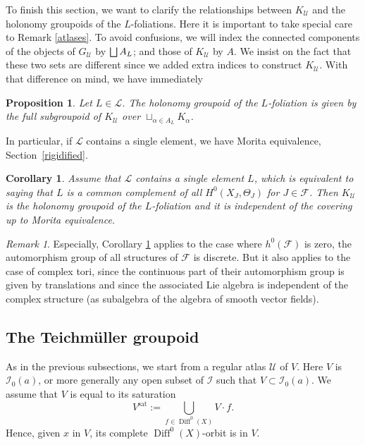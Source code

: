 \documentclass[10pt]{amsart}
\let\mathcal\mathscr
\let\oldbigsqcup\bigsqcup
\renewcommand{\bigsqcup}{\mathop{\textstyle\oldbigsqcup}\displaylimits}
\newcommand{\sat}{\mathrm{sat}}
\DeclareMathOperator{\Diff}{Diff}
\theoremstyle{plain}
\newtheorem{corollary}[theorem]{Corollary}
\newtheorem{proposition}[theorem]{Proposition}
\theoremstyle{definition}
\theoremstyle{remark}
\newtheorem{remark}[theorem]{Remark}
\numberwithin{equation}{section}
\newcommand{\cI}{\mathcal{I}}
\begin{document}
To finish this section, we want to clarify the relationships between $K_{\mathcal U}$ and the holonomy groupoids of the $L$-foliations. Here it is important to take special care to Remark \ref{atlases}. To avoid confusions, we will index the connected components of the objects of $G_{\mathcal U}$ by $\bigsqcup A_L$; and those of $K_{\mathcal U}$ by $A$. We insist on the fact that these two sets are different since we added extra indices to construct $K_{\mathcal U}$. With that difference on mind, we have immediately

\begin{proposition}
\label{autregroupoid}
Let $L\in\mathcal L$. The holonomy groupoid of the $L$-foliation is given by the full subgroupoid of $K_{\mathcal U}$ over $\sqcup_{\alpha\in A_L}K_\alpha$.
\end{proposition}

In particular, if $\mathcal L$ contains a single element, we have Morita equivalence, \cf Section~\ref{rigidified}.

\begin{corollary}
\label{groupoidIIbis}
Assume that $\mathcal L$ contains a single element $L$, which is equivalent to saying that $L$ is a common complement of all $H^0(X_J,\Theta_J)$ for $J\in \mathcal F$. Then $K_{\mathcal U}$ is the holonomy groupoid of the $L$-foliation and it is independent of the covering up to Morita equivalence.
\end{corollary}

\begin{remark}
\label{applicor}
Especially, Corollary \ref{groupoidIIbis} applies to the case where $h^0(\mathcal F)$ is zero, \ie the automorphism group of all structures of $\mathcal F$ is discrete. But it also applies to the case of complex tori, since the continuous part of their automorphism group is given by translations and since the associated Lie algebra is independent of the complex structure (as subalgebra of the algebra of smooth vector fields). \end{remark}

\subsection{The Teichmüller groupoid}
\label{Teichsub}
As in the previous subsections, we start from a regular atlas $\mathcal U$ of $V$. Here $V$ is $\cI_0(a)$, or more generally any open subset of $\cI$ such that $V\subset \cI_0(a)$. We assume that $V$ is equal to its saturation
\begin{equation}
\label{sat}
V^{\sat}:=\bigcup_{f\in\Diff^0(X)}V\cdot f.
\end{equation}
Hence, given $x$ in $V$, its complete $\Diff^0(X)$-orbit is in $V$.
\end{document}
